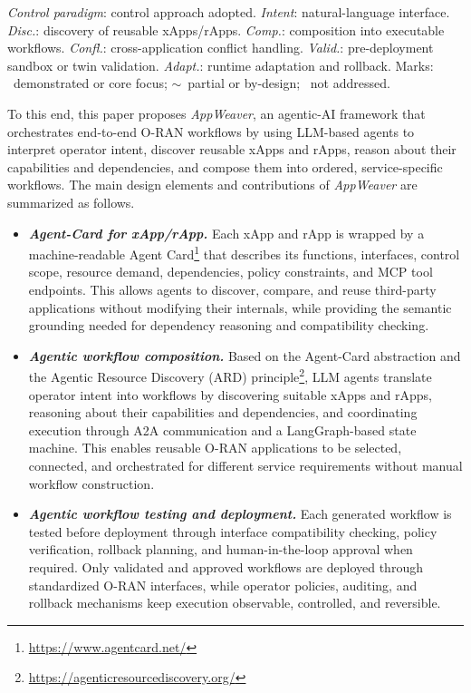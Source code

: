 \documentclass[conference]{IEEEtran}
\begin{document}
\begin{table}[t]
\begin{tabular}{@{}llccccccl@{}}
\bottomrule
\end{tabular}
\begin{minipage}{\textwidth}
\vspace{2pt}
\footnotesize
\emph{Control paradigm}: control approach adopted. \emph{Intent}: natural-language interface. \emph{Disc.}: discovery of reusable xApps/rApps. \emph{Comp.}: composition into executable workflows. \emph{Confl.}: cross-application conflict handling. \emph{Valid.}: pre-deployment sandbox or twin validation. \emph{Adapt.}: runtime adaptation and rollback. Marks: ~demonstrated or core focus; $\sim$~partial or by-design; ~not addressed.
\end{minipage}
\end{table}



To this end, this paper proposes \emph{AppWeaver}, an agentic-AI framework that orchestrates end-to-end O-RAN workflows by using LLM-based agents to interpret operator intent, discover reusable xApps and rApps, reason about their capabilities and dependencies, and compose them into ordered, service-specific workflows. The main design elements and contributions of \emph{AppWeaver} are summarized as follows.
\begin{itemize}
    \item \textbf{\textit{Agent-Card for xApp/rApp.}}     Each xApp and rApp is wrapped by a machine-readable Agent Card\footnote{\url{https://www.agentcard.net/}} that describes its functions, interfaces, control scope, resource demand, dependencies, policy constraints, and MCP tool endpoints. This allows agents to discover, compare, and reuse third-party applications without modifying their internals, while providing the semantic grounding needed for dependency reasoning and compatibility checking. 
    \item \textbf{\textit{Agentic workflow composition.}}   Based on the Agent-Card abstraction and the Agentic Resource Discovery (ARD) principle\footnote{\url{https://agenticresourcediscovery.org/}}, LLM agents translate operator intent into workflows by discovering suitable xApps and rApps, reasoning about their capabilities and dependencies, and coordinating execution through A2A communication and a LangGraph-based state machine. This enables reusable O-RAN applications to be selected, connected, and orchestrated for different service requirements without manual workflow construction.
    \item \textbf{\textit{Agentic workflow testing and deployment.}}  Each generated workflow is tested before deployment through interface compatibility checking, policy verification, rollback planning, and human-in-the-loop approval when required. Only validated and approved workflows are deployed through standardized O-RAN interfaces, while operator policies, auditing, and rollback mechanisms keep execution observable, controlled, and reversible.
\end{itemize}
\end{document}
